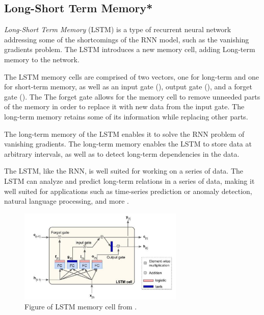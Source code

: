 \subsection{Long-Short Term Memory*}
\label{section:BT:LSTM}

\textit{Long-Short Term Memory} (LSTM) is a type of recurrent neural network addressing some of the shortcomings of the RNN model,
such as the vanishing gradients problem.
The LSTM introduces a new memory cell, adding Long-term memory to the network.

The LSTM memory cells are comprised of two vectors, one for long-term and one for short-term memory,
as well as an input gate (), output gate (),
and a forget gate (). The
The forget gate allows for the memory cell to remove unneeded parts of the memory in order to replace it with new data from the input gate.
The long-term memory retains some of its information while replacing other parts.

The long-term memory of the LSTM enables it to solve the RNN problem of vanishing gradients.
The long-term memory enables the LSTM to store data at arbitrary intervals, as well as to detect long-term dependencies in the data.

The LSTM, like the RNN, is well suited for working on a series of data.
The LSTM can analyze and predict long-term relations in a series of data, making it well suited for applications such as time-series prediction or anomaly detection,
natural language processing, and more
\cite[p.~492-493]{Geron2017}.

\begin{figure}[h!]
  \centering
  \includegraphics[width=0.7\textwidth]{./sections/BT/figures/lstm_cell_hands_on.png}
  \hfill
  \caption{Figure of LSTM memory cell from \cite[p.~492]{Geron2017}.}
  \label{fig:lstm-memory-cell}
\end{figure}

